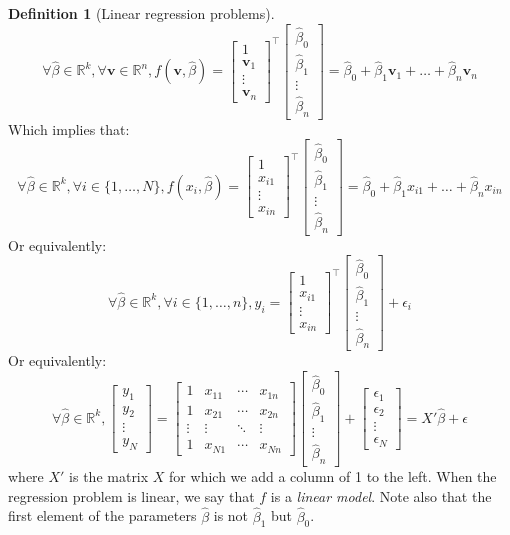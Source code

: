 \documentclass{article}
\theoremstyle{definition}
\newtheorem{definition}{Definition}[section]
\theoremstyle{remark}
\theoremstyle{example}
\newcommand{\vv}{\mathbf{v}}
\newcommand{\betat}{\hat{\beta}}
\newcommand{\fvector}[2]{\begin{bmatrix} #1_1 \\ #1_2 \\ \vdots \\ #1_{#2} \end{bmatrix}}
\begin{document}
\begin{definition}[Linear regression problems]
		\begin{equation} \label{eqn1}
				\forall \betat \in \mathbb{R}^k, \forall \vv \in \mathbb{R}^n, f(\vv, \betat) = \begin{bmatrix} 1 \\ \vv_1 \\ \vdots \\ \vv_n \end{bmatrix}^\top \begin{bmatrix} \betat_0 \\ \betat_1 \\ \vdots \\ \betat_n \end{bmatrix} = \betat_0 + \betat_1 \vv_1 + \dots + \betat_n \vv_n
		\end{equation}
		Which implies that:
				$$\forall \betat \in \mathbb{R}^k, \forall i \in \{1, \dots, N\}, f(x_i, \betat) = \begin{bmatrix} 1 \\ x_{i1} \\ \vdots \\ x_{in} \end{bmatrix}^\top \begin{bmatrix} \betat_0 \\ \betat_1 \\ \vdots \\ \betat_n \end{bmatrix} = \betat_0 + \betat_1 x_{i1} + \dots + \betat_n x_{in}$$
		Or equivalently:
				$$\forall \betat \in \mathbb{R}^k, \forall i \in \{1, \dots, n\}, y_i = \begin{bmatrix} 1 \\ x_{i1} \\ \vdots \\ x_{in} \end{bmatrix}^\top \begin{bmatrix} \betat_0 \\ \betat_1 \\ \vdots \\ \betat_n \end{bmatrix} + \epsilon_i$$
		Or equivalently:
				$$\forall \betat \in \mathbb{R}^k, \fvector{y}{N} = \begin{bmatrix} 1 & x_{11} & \cdots & x_{1n} \\ 1 & x_{21} & \cdots & x_{2n} \\ \vdots & \vdots & \ddots & \vdots \\ 1 & x_{N1} & \cdots & x_{Nn} \end{bmatrix} \begin{bmatrix} \betat_0 \\ \betat_1 \\ \vdots \\ \betat_n \end{bmatrix} + \fvector{\epsilon}{N} = X' \betat + \epsilon$$
		where $X'$ is the matrix $X$ for which we add a column of 1 to the left. When the regression problem is linear, we say that $f$ is a \textit{linear model}. Note also that the first element of the parameters $\betat$ is not $\betat_1$ but $\betat_0$.
\end{definition}
\end{document}
